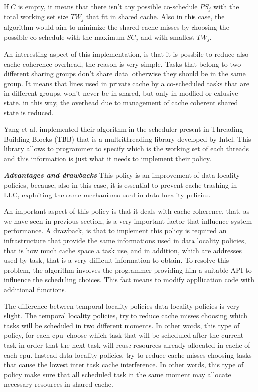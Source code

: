 \begin{description}
If $C$ is empty, it means that there isn't any possible co-schedule $PS_j$ with the total working set size $TW_j$ that fit in shared cache. Also in this 
case, the algorithm would aim to minimize the shared cache misses by choosing the possible co-schedule with the maximum $SC_j$ and with smallest $TW_j$.

An interesting aspect of this implementation, is that it is possbile to reduce also cache coherence overhead, the reason is very simple. Tasks that belong 
to two different sharing groups don't share data, otherwise they should be in the same group. It means that lines used in private cache by
a co-scheduled tasks that are in different groups, won't never be in shared, but only in modfied or exlusive state. in this way, the overhead due to 
management of cache coherent shared state is reduced. 

Yang et al. implemented their algorithm in the scheduler present in Threading Building Blocks (TBB) that is a multrithreading library developed by Intel. 
This library allows to programmer to specify which is the working set of each threads and this information is just what it needs to implement their policy. 


\textbf{\textit{Advantages and drawbacks}}
This policy is an improvement of data locality policies, because, also in this case, it is essential to prevent cache trashing in LLC,
exploiting the same mechanisms used in data locality policies.

An important aspect of this policy is that it deals with cache coherence, that, as we have seen in previous section, is a very important factor that 
influence system performance. A drawback, is that to implement this policy is required an infrastructure that provide the same informations used in 
data locality policies, that is how much cache space a task use, and in addition, which are addresses used by task, that is a very difficult information
to obtain. To resolve this problem, the algorithm involves the programmer providing him a suitable API to influence the scheduling choices. This fact 
means to modify appllication code with additional functions. 
\end{description}

The difference between temporal locality policies data locality policies is very slight. The temporal locality policies, try to reduce cache misses 
choosing which tasks will be scheduled in two different moments. In other words, this type of policy, for each cpu, choose which task that will be 
scheduled after the current task in order that the next task will reuse resources already allocated in cache of each cpu. Instead data locality policies, 
try to reduce cache misses choosing tasks that cause the lowest inter task cache interference. In other words, this type of policy make sure that all 
scheduled task in the same moment may allocate necessary resources in shared cache.

